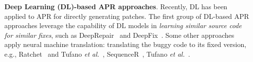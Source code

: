
{\bf Deep Learning (DL)-based APR approaches}. Recently, DL has been
applied to APR for directly generating patches.  The first group of
DL-based APR approaches leverage the capability of DL models in {\em
  learning similar source code for similar fixes}, such as
DeepRepair~\cite{white2016deep} and DeepFix~\cite{gupta2017deepfix}.
Some other approaches apply neural machine translation:
translating the buggy code to its fixed version, e.g.,
Ratchet~\cite{hata2018learning} and Tufano {\em et
  al.}~\cite{tufano2018empirical}, SequenceR~\cite{chen2018sequencer},
Tufano {\em et al.}~\cite{tufano2019learning}.

